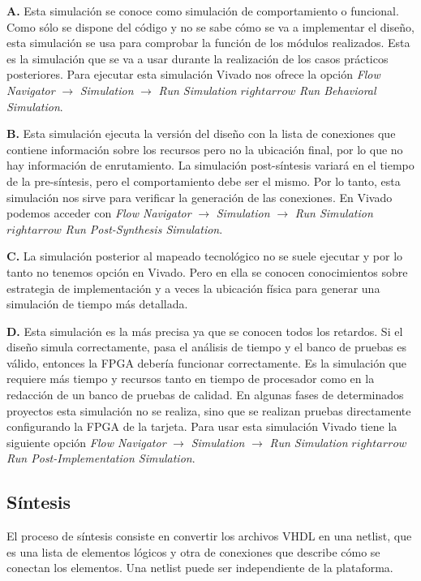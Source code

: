 \textbf{A.} Esta simulación se conoce como simulación de comportamiento o funcional. Como sólo se dispone 
del código y no se sabe cómo se va a implementar el diseño, esta simulación se usa para comprobar la 
función de los módulos realizados. Esta es la simulación que se va a usar durante la realización de los 
casos prácticos posteriores. Para ejecutar esta simulación Vivado nos ofrece la opción \textit{Flow Navigator} 
$\rightarrow$ \textit{Simulation} $\rightarrow$ \textit{Run Simulation} $rightarrow$ \textit{Run 
Behavioral Simulation}.

\textbf{B.} Esta simulación ejecuta la versión del diseño con la lista de conexiones que contiene 
información sobre los recursos pero no la ubicación final, por lo que no hay información de enrutamiento. 
La simulación post-síntesis variará en el tiempo de la pre-síntesis, pero el comportamiento debe ser el 
mismo. Por lo tanto, esta simulación nos sirve para verificar la generación de las conexiones. En Vivado 
podemos acceder con \textit{Flow Navigator} $\rightarrow$ \textit{Simulation} $\rightarrow$ \textit{Run 
Simulation} $rightarrow$ \textit{Run Post-Synthesis Simulation}.

\textbf{C.} La simulación posterior al mapeado tecnológico no se suele ejecutar y por lo tanto no tenemos opción en Vivado. 
Pero en ella se conocen conocimientos sobre estrategia de implementación y a veces la ubicación física para 
generar una simulación de tiempo más detallada.

\textbf{D.} Esta simulación es la más precisa ya que se conocen todos los retardos. Si el diseño simula 
correctamente, pasa el análisis de tiempo y el banco de pruebas es válido, entonces la FPGA debería funcionar 
correctamente. Es la simulación que requiere más tiempo y recursos tanto en tiempo de procesador como en la redacción 
de un banco de pruebas de calidad. En algunas fases de determinados proyectos esta simulación no se realiza, sino que se 
realizan pruebas directamente configurando la FPGA de la tarjeta. Para usar esta simulación Vivado tiene 
la siguiente opción \textit{Flow Navigator} $\rightarrow$ \textit{Simulation} $\rightarrow$ \textit{Run 
Simulation} $rightarrow$ \textit{Run Post-Implementation Simulation}.

\subsection{Síntesis}

El proceso de síntesis consiste en convertir los archivos VHDL en una netlist, que es una lista de elementos 
lógicos y otra de conexiones que describe cómo se conectan los elementos. Una netlist puede ser independiente 
de la plataforma. 

